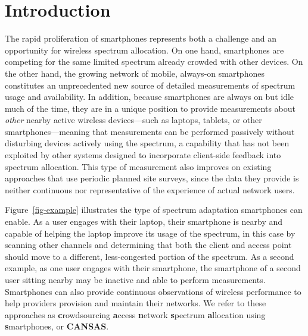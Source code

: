 \section{Introduction}

The rapid proliferation of smartphones represents both a challenge and an
opportunity for wireless spectrum allocation. On one hand, smartphones are
competing for the same limited spectrum already crowded with other devices.
On the other hand, the growing network of mobile, always-on smartphones
constitutes an unprecedented new source of detailed measurements of spectrum
usage and availability. In addition, because smartphones are always on but
idle much of the time, they are in a unique position to provide measurements
about \textit{other} nearby active wireless devices---such as laptops,
tablets, or other smartphones---meaning that measurements can be performed
passively without disturbing devices actively using the spectrum, a
capability that has not been exploited by other systems designed to
incorporate client-side feedback into spectrum allocation. This type of
measurement also improves on existing approaches that use periodic planned
site surveys, since the data they provide is neither continuous nor
representative of the experience of actual network users.

Figure~\ref{fig-example} illustrates the type of spectrum adaptation
smartphones can enable. As a user engages with their laptop, their smartphone
is nearby and capable of helping the laptop improve its usage of the
spectrum, in this case by scanning other channels and determining that both
the client and access point should move to a different, less-congested
portion of the spectrum. As a second example, as one user engages with their
smartphone, the smartphone of a second user sitting nearby may be inactive
and able to perform measurements. Smartphones can also provide continuous
observations of wireless performance to help providers provision and maintain
their networks. We refer to these approaches as \textbf{c}rowdsourcing
\textbf{a}ccess \textbf{n}etwork \textbf{s}pectrum \textbf{a}llocation using
\textbf{s}martphones, or \textbf{CANSAS}.

